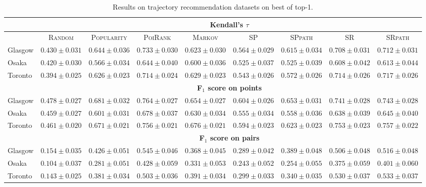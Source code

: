 \begin{table*}[!h]
\caption{Results on trajectory recommendation datasets on best of top-1.}
\centering
\scriptsize
\setlength{\tabcolsep}{3pt} %
\begin{tabular}{l|cc|ccc|ccc} \hline
& \multicolumn{8}{c}{\bf Kendall's $\tau$} \\ \hline
 & \textsc{Random} & \textsc{Popularity} & \textsc{PoiRank} & \textsc{Markov} & \textsc{SP} & \textsc{SPpath} & \textsc{SR} & \textsc{SRpath} \\ \hline
Glasgow & $0.430\pm0.031$ & $0.644\pm0.036$ & $\mathbf{0.733\pm0.030}$ & $0.623\pm0.030$ & $0.564\pm0.029$ & $0.615\pm0.034$ & $0.708\pm0.031$ & $\mathit{0.712\pm0.031}$ \\
Osaka & $0.420\pm0.030$ & $0.566\pm0.034$ & $\mathbf{0.644\pm0.040}$ & $0.600\pm0.036$ & $0.525\pm0.037$ & $0.525\pm0.039$ & $0.608\pm0.042$ & $\mathit{0.613\pm0.044}$ \\
Toronto & $0.394\pm0.025$ & $0.626\pm0.023$ & $\mathit{0.714\pm0.024}$ & $0.629\pm0.023$ & $0.543\pm0.026$ & $0.572\pm0.026$ & $0.714\pm0.026$ & $\mathbf{0.717\pm0.026}$ \\
\hline
& \multicolumn{8}{c}{\bf F$_1$ score on points} \\ \hline
Glasgow & $0.478\pm0.027$ & $0.681\pm0.032$ & $\mathbf{0.764\pm0.027}$ & $0.654\pm0.027$ & $0.604\pm0.026$ & $0.653\pm0.031$ & $0.741\pm0.028$ & $\mathit{0.743\pm0.028}$ \\
Osaka & $0.459\pm0.027$ & $0.601\pm0.031$ & $\mathbf{0.678\pm0.037}$ & $0.630\pm0.034$ & $0.555\pm0.034$ & $0.558\pm0.036$ & $0.638\pm0.039$ & $\mathit{0.645\pm0.040}$ \\
Toronto & $0.461\pm0.020$ & $0.671\pm0.021$ & $\mathit{0.756\pm0.021}$ & $0.676\pm0.021$ & $0.594\pm0.023$ & $0.623\pm0.023$ & $0.753\pm0.023$ & $\mathbf{0.757\pm0.022}$ \\
\hline
& \multicolumn{8}{c}{\bf F$_1$ score on pairs} \\ \hline
Glasgow & $0.154\pm0.035$ & $0.426\pm0.051$ & $\mathbf{0.545\pm0.046}$ & $0.368\pm0.045$ & $0.289\pm0.042$ & $0.389\pm0.048$ & $0.506\pm0.048$ & $\mathit{0.516\pm0.048}$ \\
Osaka & $0.104\pm0.037$ & $0.281\pm0.051$ & $\mathbf{0.428\pm0.059}$ & $0.331\pm0.053$ & $0.243\pm0.052$ & $0.254\pm0.055$ & $0.375\pm0.059$ & $\mathit{0.401\pm0.060}$ \\
Toronto & $0.143\pm0.025$ & $0.381\pm0.034$ & $0.503\pm0.036$ & $0.391\pm0.034$ & $0.299\pm0.033$ & $0.340\pm0.035$ & $\mathit{0.530\pm0.037}$ & $\mathbf{0.533\pm0.037}$ \\
\hline
\end{tabular}
\end{table*}


